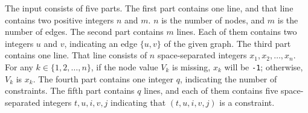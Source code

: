 The input consists of five parts.
The first part contains one line, and that line 
contains two positive integers $n$ and $m$. 
$n$ is the number of nodes, and $m$ is the number of edges.
The second part contains $m$ lines.
Each of them contains two integers $u$ and $v$, indicating an edge $\{u, v\}$
of the given graph.
The third part contains one line.
That line consists of $n$ space-separated integers $x_1,x_2,\dots,x_n$. 
For any $k\in\{1,2,\dots,n\}$, if the node value $V_k$ is missing, 
$x_k$ will be \verb+-1+; otherwise, $V_k$ is $x_k$.
The fourth part contains one integer $q$, indicating the number of constraints.
The fifth part contains $q$ lines, and each of them contains
five space-separated integers $t, u, i, v, j$ indicating that 
$(t, u, i, v, j)$ is a constraint.
